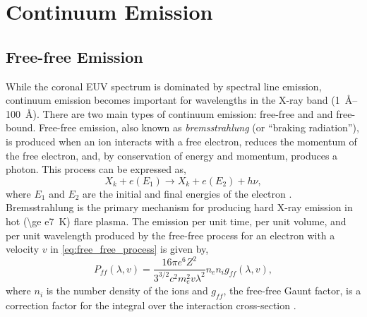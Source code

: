 \section{Continuum Emission}\label{sec:continuum}

\subsection{Free-free Emission}

While the coronal EUV spectrum is dominated by spectral line emission, continuum emission becomes important for wavelengths in the X-ray band (\SIrange{1}{100}{\angstrom}). There are two main types of continuum emission: free-free and and free-bound. Free-free emission, also known as \textit{bremsstrahlung} (or ``braking radiation''), is produced when an ion interacts with a free electron, reduces the momentum of the free electron, and, by conservation of energy and momentum, produces a photon. This process can be expressed as,
\begin{equation}\label{eq:free_free_process}
    X_k + e(E_1) \to X_k + e(E_2) + h\nu,
\end{equation}
where $E_1$ and $E_2$ are the initial and final energies of the electron \citep{del_zanna_solar_2018}. Bremsstrahlung is the primary mechanism for producing hard X-ray emission in hot (\SI{\ge e7}{\kelvin}) flare plasma. The emission per unit time, per unit volume, and per unit wavelength produced by the free-free process for an electron with a velocity $v$ in \autoref{eq:free_free_process} is given by,
\begin{equation}\label{eq:bremsstrahlung_single}
    P_{ff}(\lambda,v) = \frac{16\pi e^6Z^2}{3^{3/2}c^2m_e^2v\lambda^2}n_en_ig_{ff}(\lambda,v),
\end{equation}
where $n_i$ is the number density of the ions and $g_{ff}$, the free-free Gaunt factor, is a correction factor for the integral over the interaction cross-section \citep{rybicki_radiative_1979}.

